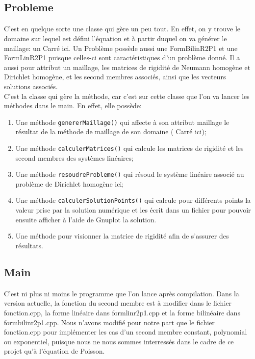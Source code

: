 \subsection{Probleme}
\paragraph{}C'est en quelque sorte une classe qui gère un peu tout. En effet, on y trouve le domaine sur lequel est défini l'équation et à partir duquel on va générer le maillage: un Carré ici. Un Problème possède aussi une FormBilinR2P1 et une FormLinR2P1 puisque celles-ci sont caractéristiques d'un problème donné. Il a aussi pour attribut un maillage, les matrices de rigidité de Neumann homogène et Dirichlet homogène, et les second membres associés, ainsi que les vecteurs solutions associés.\\

C'est la classe qui gère la méthode, car c'est sur cette classe que l'on va lancer les méthodes dans le main. En effet, elle possède:
\begin{enumerate}
\item Une méthode \texttt{genererMaillage()} qui affecte à son attribut maillage le résultat de la méthode de maillage de son domaine ( Carré ici);
\item Une méthode \texttt{calculerMatrices()} qui calcule les matrices de rigidité et les second membres des systèmes linéaires;\\
\item Une méthode \texttt{resoudreProbleme()} qui résoud le système linéaire associé au problème de Dirichlet homogène ici;\\
\item Une méthode \texttt{calculerSolutionPoints()} qui calcule pour différents points la valeur prise par la solution numérique et les écrit dans un fichier pour pouvoir ensuite afficher à l'aide de Gnuplot la solution.\\
\item Une méthode pour visionner la matrice de rigidité afin de s'assurer des résultats.\\
\end{enumerate}

\subsection{Main}
\paragraph{} C'est ni plus ni moins le programme que l'on lance après compilation. Dans la version actuelle, la fonction du second membre est à modifier dans le fichier fonction.cpp, la forme linéaire dans formlinr2p1.cpp et la forme bilinéaire dans formbilinr2p1.cpp. Nous n'avons modifié pour notre part que le fichier fonction.cpp pour implémenter les cas d'un second membre constant, polynomial ou exponentiel, puisque nous ne nous sommes interressés dans le cadre de ce projet qu'à l'équation de Poisson.\\

